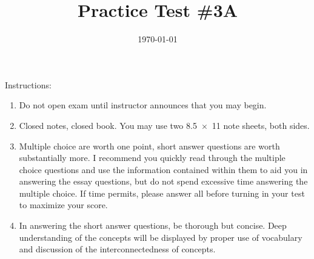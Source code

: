 \documentclass[exam,addpoints,noanswers]{exam}
\title{Practice Test \#3A}
\date{\today}
\author{\mobeardInstructorShort}
\begin{document}
\maketitle
\vfill
\mobeardExamNameBlock
\vfill
Instructions: 
\begin{enumerate}
\item Do not open exam until instructor announces that you may begin.
\item Closed notes, closed book.  You may use two \SI{8.5x11}{\inch} note sheets, both sides.
\item Multiple choice are worth one point, short answer questions are worth substantially more. I recommend you quickly read through the multiple choice questions and use the information contained within them to aid you in answering the essay questions, but do not spend excessive time answering the multiple choice. If time permits, please answer all before turning in your test to maximize your score.
\item In answering the short answer questions, be thorough but concise. Deep understanding of the concepts will be displayed by proper use of vocabulary and discussion of the interconnectedness of concepts.
\end{enumerate}
\vfill
\begin{center}
\gradetable[h][questions]
\end{center}
\clearpage
\end{document}
